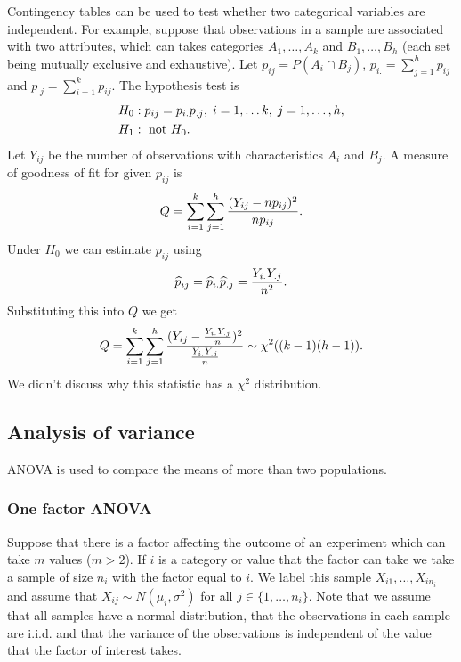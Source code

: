 \documentclass[10pt, two column]{article}
\begin{document}
Contingency tables can be used to test whether two categorical variables are independent. For example, suppose that observations in a sample are associated with two attributes, which can takes categories $A_{1}, \dots, A_{k}$ and $B_{1}, \dots, B_{h}$ (each set being mutually exclusive and exhaustive). Let $p_{ij} = P(A_{i} \cap B_{j})$, $p_{i.} = \sum_{j=1}^{h} p_{ij}$ and $p_{.j} = \sum_{i=1}^{k} p_{ij}$. The hypothesis test is \vspace{-5pt}
\begin{align*}
H_{0}&: p_{ij} = p_{i.}p_{.j}, \; i= 1, \dots k, \; j = 1, \dots, h, \\
H_{1}&: \text{ not } H_{0}. \vspace{-5pt}
\end{align*}
Let $Y_{ij}$ be the number of observations with characteristics $A_{i}$ and $B_{j}$. A measure of goodness of fit for given $p_{ij}$ is \vspace{-5pt} 
\[
Q = \sum_{i=1}^{k} \sum_{j=1}^{h} \frac{(Y_{ij} - np_{ij})^{2}}{np_{ij}}. \vspace{-5pt}
\]
Under $H_{0}$ we can estimate $p_{ij}$ using \vspace{-5pt} 
\[
\widehat{p}_{ij} = \widehat{p}_{i.} \widehat{p}_{.j} = \frac{Y_{i.}Y_{.j}}{n^{2}}.  \vspace{-5pt} 
\]
Substituting this into $Q$ we get \vspace{-5pt} 
\[
Q = \sum_{i=1}^{k} \sum_{j=1}^{h} \frac{(Y_{ij} - \frac{Y_{i.}Y_{.j}}{n})^{2}}{\frac{Y_{i.}Y_{.j}}{n}} \sim \chi^{2} ((k-1)(h-1)). \vspace{-5pt}
\]
We didn't discuss why this statistic has a $\chi^{2}$ distribution. 

\subsection{Analysis of variance}

ANOVA is used to compare the means of more than two populations.

\subsubsection{One factor ANOVA}
 
Suppose that there is a factor affecting the outcome of an experiment which can take $m$ values ($m > 2$). If $i$ is a category or value that the factor can take we take a sample of size $n_{i}$ with the factor equal to $i$. We label this sample $X_{i1},\dots, X_{in_{i}}$ and assume that $X_{ij} \sim N(\mu_{i}, \sigma^{2})$ for all $j \in \{1, \dots, n_{i} \}$. Note that we assume that all samples have a normal distribution, that the observations in each sample are i.i.d. and that the variance of the observations is independent of the value that the factor of interest takes. 
\end{document}
